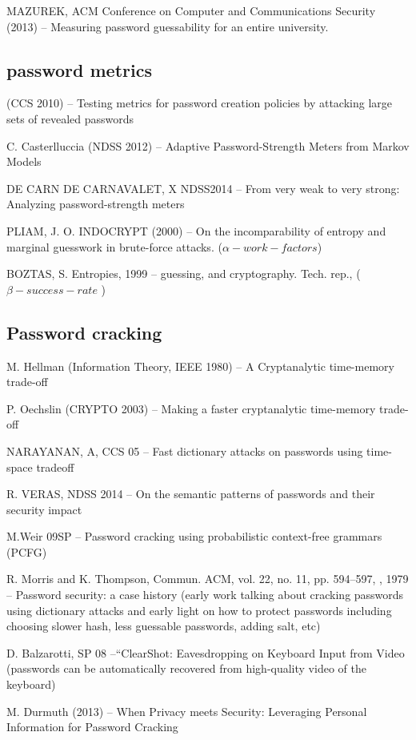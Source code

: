 \documentclass{sig-alternate}
\begin{document}
MAZUREK, ACM Conference on Computer and Communications Security (2013) -- Measuring password guessability for an entire university.

\subsection{password metrics}

(CCS 2010) -- Testing metrics for password creation policies by attacking large sets of revealed passwords

C. Casterlluccia (NDSS 2012) -- Adaptive Password-Strength Meters from Markov Models 

DE CARN DE CARNAVALET, X NDSS2014 -- From very weak to very strong: Analyzing password-strength meters

PLIAM, J. O. INDOCRYPT (2000) -- On the incomparability of entropy and marginal guesswork in brute-force attacks.  ($\alpha-work-factors$)

BOZTAS, S. Entropies, 1999 -- guessing, and cryptography. Tech. rep., ($\beta-success-rate$ )


\subsection{Password cracking}
M. Hellman (Information Theory, IEEE 1980) -- A Cryptanalytic time-memory trade-off 

P. Oechslin (CRYPTO 2003) -- Making a faster cryptanalytic time-memory trade-off 

NARAYANAN, A, CCS 05 -- Fast dictionary attacks on passwords using time-space tradeoff

R. VERAS, NDSS 2014 -- On the semantic patterns of passwords and their security impact

M.Weir 09SP -- Password cracking using probabilistic context-free grammars (PCFG)

R. Morris and K. Thompson, Commun. ACM, vol. 22, no. 11, pp. 594–597, , 1979 -- Password security: a case history (early work talking about cracking passwords using dictionary attacks and early light on how to protect passwords including choosing slower hash, less guessable passwords, adding salt, etc)

D. Balzarotti, SP 08 --“ClearShot: Eavesdropping on Keyboard Input from Video (passwords can be automatically recovered from high-quality video of the keyboard)

M. Durmuth (2013) -- When Privacy meets Security: Leveraging Personal Information for Password Cracking 
\end{document}
